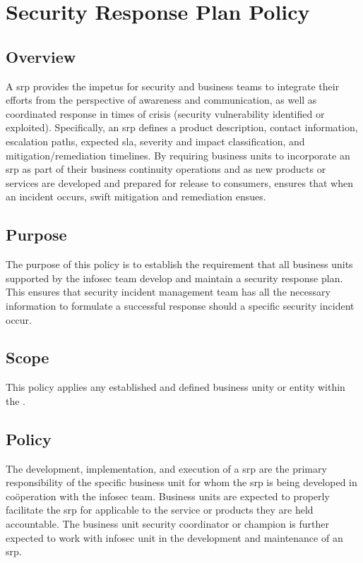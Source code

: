 \chapter{Security Response Plan Policy}
\CommonIntroduction
\section{Overview}
A \acrfull{srp} provides the impetus for security and business teams to integrate their efforts from the perspective of awareness and communication, as well as coordinated response in times of crisis (security vulnerability identified or exploited).  
Specifically, an \gls{srp} defines a product description, contact information, escalation paths, expected \gls{sla}, severity and impact classification, and mitigation/remediation timelines.  
By requiring business units to incorporate an \gls{srp} as part of their business continuity operations and as new products or services are developed and prepared for release to consumers, ensures that when an incident occurs, swift mitigation and remediation ensues.%
\section{Purpose}
The purpose of this policy is to establish the requirement that all business units supported by the \gls{infosec} team develop and maintain a security response plan.  
This ensures that security incident management team has all the necessary information to formulate a successful response should a specific security incident occur.
\section{Scope}
This policy applies any established and defined business unity or entity within the \CompanyName{}.
\section{Policy}
The development, implementation, and execution of a \acrfull{srp} are the primary responsibility of the specific business unit for whom the \gls{srp} is being developed in co\"{o}peration with the \gls{infosec} team.  
Business units are expected to properly facilitate the \gls{srp} for applicable to the service or products they are held accountable.  
The business unit security coordinator or champion is further expected to work with \CompanyName{} \gls{infosec} unit in the development and maintenance of an \gls{srp}.
